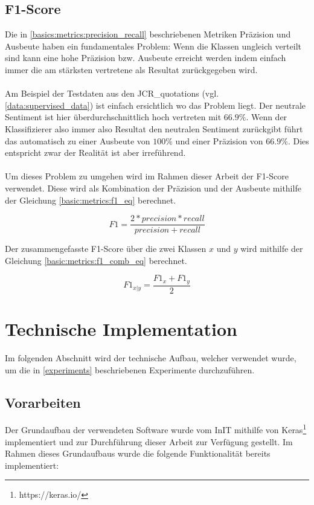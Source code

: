 \subsection{F1-Score}
Die in \ref{basics:metrics:precision_recall} beschriebenen Metriken Präzision und Ausbeute haben ein fundamentales Problem: Wenn die Klassen ungleich verteilt sind kann eine hohe Präzision bzw. Ausbeute erreicht werden indem einfach immer die am stärksten vertretene als Resultat zurückgegeben wird.\\\\Am Beispiel der Testdaten aus den JCR{\_}quotations (vgl. \ref{data:supervised_data}) ist einfach ersichtlich wo das Problem liegt. Der neutrale Sentiment ist hier überdurchschnittlich hoch vertreten mit $66.9\%$. Wenn der Klassifizierer also immer also Resultat den neutralen Sentiment zurückgibt führt das automatisch zu einer Ausbeute von $100\%$ und einer Präzision von $66.9\%$. Dies entspricht zwar der Realität ist aber irreführend.\\\\
Um dieses Problem zu umgehen wird im Rahmen dieser Arbeit der F1-Score verwendet. Diese wird als Kombination der Präzision und der Ausbeute mithilfe der Gleichung \ref{basic:metrics:f1_eq} berechnet.

\begin{equation}
\label{basic:metrics:f1_eq}
F1 = \frac{2*precision*recall}{precision + recall}
\end{equation}

Der zusammengefasste F1-Score über die zwei Klassen $x$ und $y$ wird mithilfe der Gleichung \ref{basic:metrics:f1_comb_eq} berechnet.

\begin{equation}
\label{basic:metrics:f1_comb_eq}
F1_{x|y} = \frac{F1_x + F1_y}{2}
\end{equation}

\section{Technische Implementation}
Im folgenden Abschnitt wird der technische Aufbau, welcher verwendet wurde, um die in \ref{experiments} beschriebenen Experimente durchzuführen.

\subsection{Vorarbeiten}
\label{technichal_setup:prework}
Der Grundaufbau der verwendeten Software wurde vom InIT mithilfe von Keras\footnote{https://keras.io/} implementiert und zur Durchführung dieser Arbeit zur Verfügung gestellt. Im Rahmen dieses Grundaufbaus wurde die folgende Funktionalität bereits implementiert:

